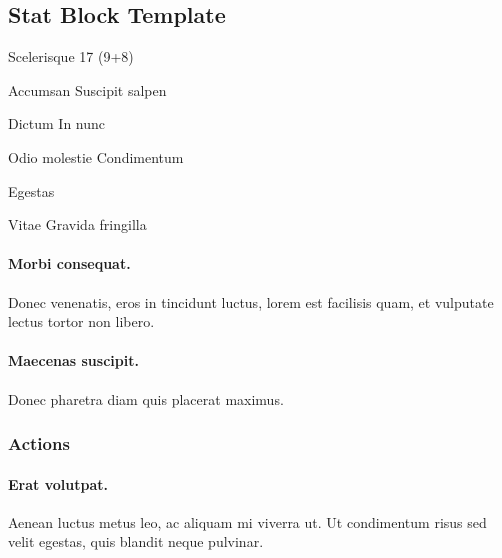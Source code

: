 \begin{hbStatBlock}
\subsection*{Stat Block Template}
\hbSBSep
\begin{hbStatBlockDescription}
\item[Scelerisque] 17 (9+8)
\item[Accumsan] Suscipit salpen
\item[Dictum] In nunc
\end{hbStatBlockDescription}
\hbSBSep
{}
\hbSBSep
\begin{hbStatBlockDescription}
\item[Odio molestie] Condimentum
\item[Egestas] \hbNone
\item[Vitae] Gravida fringilla
\end{hbStatBlockDescription}
\hbSBSep

\paragraph*{Morbi consequat.} Donec venenatis, eros in tincidunt luctus, lorem est facilisis quam, et vulputate lectus tortor non libero.

\paragraph*{Maecenas suscipit.} Donec pharetra diam quis placerat maximus.

\subsubsection*{Actions}

\paragraph*{Erat volutpat.} Aenean luctus metus leo, ac aliquam mi viverra ut. Ut condimentum risus sed velit egestas, quis blandit neque pulvinar.

\end{hbStatBlock}




\hbAppendix

 \lipsum[126]

\backmatter

 \lipsum[127]


